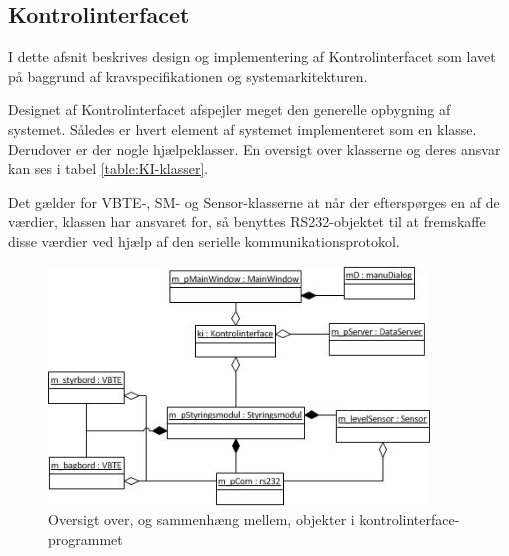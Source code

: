 \subsection{Kontrolinterfacet}
I dette afsnit beskrives design og implementering af Kontrolinterfacet som lavet på baggrund af kravspecifikationen og systemarkitekturen. 

Designet af Kontrolinterfacet afspejler meget den generelle opbygning af systemet. Således er hvert element af systemet implementeret som en klasse. Derudover er der nogle hjælpeklasser. En oversigt over klasserne og deres ansvar kan ses i tabel \ref{table:KI-klasser}.

Det gælder for VBTE-, SM- og Sensor-klasserne at når der efterspørges en af de værdier, klassen har ansvaret for, så benyttes RS232-objektet til at fremskaffe disse værdier ved hjælp af den serielle kommunikationsprotokol.


\begin{figure}[H]
\centering
\includegraphics[width = 0.9\textwidth]{billeder/Objektdiagram}
\caption{Oversigt over, og sammenhæng mellem, objekter i kontrolinterface-programmet}
\label{fig:objektdiagram}
\end{figure}


